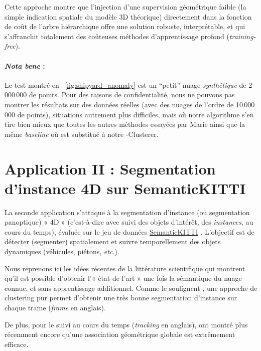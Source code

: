 Cette approche montre que l'injection d'une supervision géométrique faible (la simple indication spatiale du modèle 3D théorique) directement dans la fonction de coût de l'arbre hiérarchique offre une solution robuste, interprétable, et qui s'affranchit totalement des coûteuses méthodes d'apprentissage profond (\emph{training-free}).

\paragraph{\emph{Nota bene} :} Le test montré en \Fig~\ref{fig:shipyard_anomaly} est un ``petit'' nuage \emph{synthétique} de 2\,000\,000 de points. Pour des raisons de confidentialité, nous ne pouvons pas montrer les résultats sur des données réelles (avec des nuages de l'ordre de 10\,000\,000 de points), situations autrement plus difficiles, mais où notre algorithme s'en tire bien mieux que toutes les autres méthodes essayées par Marie  ainsi que la même \emph{baseline} où \HDBSCAN est substitué à notre \HGP-Clusterer.


\section{Application II : {Segmentation d'instance 4D} sur SemanticKITTI}

La seconde application s'attaque à la segmentation d'instance (ou segmentation panoptique) « 4D » (c'est-à-dire avec suivi des objets d'intérêt, des \emph{instances}, au cours du temps), évaluée sur le jeu de données \href{https://semantic-kitti.org/}{SemanticKITTI} \cite{SemanticKITTI}. L'objectif est de détecter (segmenter) spatialement et suivre temporellement des objets dynamiques (véhicules, piétons, \emph{etc}.).

Nous reprenons ici les idées récentes de la littérature scientifique qui montrent qu'il est possible d'obtenir l'« état-de-l'art » une fois la sémantique du nuage connue, et sans apprentissage additionnel. Comme le soulignent  \etal \cite{Sautier2025}, une approche de clustering pur permet d'obtenir une très bonne segmentation d'instance sur chaque trame (\emph{frame} en anglais). 

De plus, pour le suivi au cours du temps (\emph{tracking} en anglais),  \etal \cite{Oh2025} ont montré plus récemment encore qu'une association géométrique globale est extrêmement efficace.

